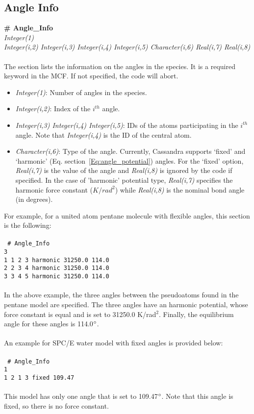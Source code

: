 \subsection{Angle Info}\label{sec:Get_Angle_Info}
%
{\bf \# Angle\_Info} \\
%
{\it Integer(1)} \\
%
{\it Integer(i,2) Integer(i,3) Integer(i,4) Integer(i,5)
  Character(i,6) Real(i,7) Real(i,8)} \\ \\
%
The section lists the information on the angles in the species.
It is a required keyword in the MCF. If not specified, the code
will abort. \\
%
\begin{itemize}
\item {\it Integer(1)}: Number of angles in the species.
%
\item {\it Integer(i,2)}: Index of the $i^{th}$ angle.
%
\item {\it Integer(i,3) Integer(i,4) Integer(i,5)}: IDs of the atoms
participating in the $i^{th}$ angle. Note that {\it Integer(i,4)} is
the ID of the central atom.
%
\item {\it Character(i,6)}: Type of the angle. Currently,
Cassandra supports `fixed' and `harmonic' (Eq. section~\ref{Eq:angle_potential})
angles. For the `fixed' option, {\it Real(i,7)} is the value of the
angle and {\it Real(i,8)} is ignored by the code if specified. In the
case of 'harmonic' potential type, {\it Real(i,7)} specifies the
harmonic force constant ($K/rad^2$) while {\it Real(i,8)} is the nominal bond
angle (in degrees).

\end{itemize}
For example, for a united atom pentane molecule with flexible angles, this section is the following: \\ \\
%
\texttt{
\# Angle\_Info \\
3 \\
1    1    2    3    harmonic     31250.0    114.0\\
2    2    3    4    harmonic     31250.0    114.0\\
3    3    4    5    harmonic     31250.0    114.0\\
} \\
%
In the above example, the three angles between the pseudoatoms found in the pentane model are specified.
The three angles have an harmonic potential, whose force constant is equal and is set to 31250.0 K/rad$^2$.
Finally, the equilibrium angle for these angles is 114.0$\degree$. \\ \\
%
An example for SPC/E water model with fixed angles is provided below: \\ \\
%
\texttt{
\# Angle\_Info \\
1 \\
1    2    1    3   fixed  109.47 \\
} \\
This model has only one angle that is set to 109.47$\degree$. Note that this angle is fixed, so there is no
force constant.
%
